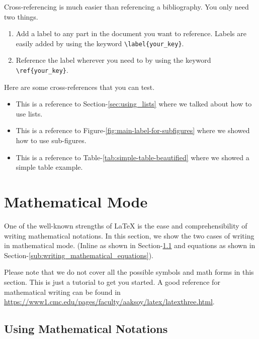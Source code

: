 Cross-referencing is much easier than referencing a bibliography. You only need two things.

\begin{enumerate}
    \item Add a label to any part in the document you want to reference. Labels are easily added by using the keyword \verb|\label{your_key}|.
    \item Reference the label wherever you need to by using the keyword \verb|\ref{your_key}|.
\end{enumerate}

Here are some cross-references that you can test.

\begin{itemize}
    \item This is a reference to Section-\ref{sec:using_lists} where we talked about how to use lists. 
    \item This is a reference to Figure-\ref{fig:main-label-for-subfigures} where we showed how to use sub-figures. 
    \item This is a reference to Table-\ref{tab:simple-table-beautified} where we showed a simple table example.
\end{itemize}


\section{Mathematical Mode}
\label{sec:mathematical_mode}

One of the well-known strengths of {\LaTeX} is the ease and comprehensibility of writing mathematical notations. In this section, we show the two cases of writing in mathematical mode. (Inline as shown in Section-\ref{sub:using_mathematical_notations} and equations as shown in Section-\ref{sub:writing_mathematical_equations}).

Please note that we do not cover all the possible symbols and math forms in this section. This is just a tutorial to get you started. A good reference for mathematical writing can be found in \href{https://www1.cmc.edu/pages/faculty/aaksoy/latex/latexthree.html}{https://www1.cmc.edu/pages/faculty/aaksoy/latex/latexthree.html}.

\subsection{Using Mathematical Notations}
\label{sub:using_mathematical_notations}

